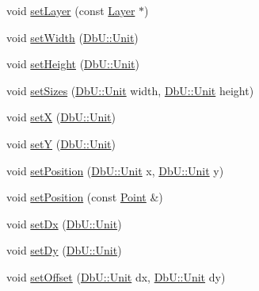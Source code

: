 \begin{DoxyCompactItemize}
\item 
void \mbox{\hyperlink{classHurricane_1_1Contact_aec627634d5b6cfc5079a02b1b518b50e}{set\+Layer}} (const \mbox{\hyperlink{classHurricane_1_1Layer}{Layer}} $\ast$)
\item 
void \mbox{\hyperlink{classHurricane_1_1Contact_a08d14ce6cdf3696e472f4a621b936afe}{set\+Width}} (\mbox{\hyperlink{group__DbUGroup_ga4fbfa3e8c89347af76c9628ea06c4146}{Db\+U\+::\+Unit}})
\item 
void \mbox{\hyperlink{classHurricane_1_1Contact_a6480b6a75cc098d3227f27080a2cb42b}{set\+Height}} (\mbox{\hyperlink{group__DbUGroup_ga4fbfa3e8c89347af76c9628ea06c4146}{Db\+U\+::\+Unit}})
\item 
void \mbox{\hyperlink{classHurricane_1_1Contact_a1bded13596d448c6bb9c93271fffe5fd}{set\+Sizes}} (\mbox{\hyperlink{group__DbUGroup_ga4fbfa3e8c89347af76c9628ea06c4146}{Db\+U\+::\+Unit}} width, \mbox{\hyperlink{group__DbUGroup_ga4fbfa3e8c89347af76c9628ea06c4146}{Db\+U\+::\+Unit}} height)
\item 
void \mbox{\hyperlink{classHurricane_1_1Contact_a5b2338675993259feabb641fd9a1996e}{setX}} (\mbox{\hyperlink{group__DbUGroup_ga4fbfa3e8c89347af76c9628ea06c4146}{Db\+U\+::\+Unit}})
\item 
void \mbox{\hyperlink{classHurricane_1_1Contact_a232a49a5dd180e9ff8dfb2bd2a67f2cd}{setY}} (\mbox{\hyperlink{group__DbUGroup_ga4fbfa3e8c89347af76c9628ea06c4146}{Db\+U\+::\+Unit}})
\item 
void \mbox{\hyperlink{classHurricane_1_1Contact_ae44d4d7655428705f13dca34c7167690}{set\+Position}} (\mbox{\hyperlink{group__DbUGroup_ga4fbfa3e8c89347af76c9628ea06c4146}{Db\+U\+::\+Unit}} x, \mbox{\hyperlink{group__DbUGroup_ga4fbfa3e8c89347af76c9628ea06c4146}{Db\+U\+::\+Unit}} y)
\item 
void \mbox{\hyperlink{classHurricane_1_1Contact_aedcc63fe54538939c03fe81a16b0bae0}{set\+Position}} (const \mbox{\hyperlink{classHurricane_1_1Point}{Point}} \&)
\item 
void \mbox{\hyperlink{classHurricane_1_1Contact_a82f29c6b48b0c5a51fe3c1678d71876c}{set\+Dx}} (\mbox{\hyperlink{group__DbUGroup_ga4fbfa3e8c89347af76c9628ea06c4146}{Db\+U\+::\+Unit}})
\item 
void \mbox{\hyperlink{classHurricane_1_1Contact_ac5dadc06ae38c1ff287f031864f58850}{set\+Dy}} (\mbox{\hyperlink{group__DbUGroup_ga4fbfa3e8c89347af76c9628ea06c4146}{Db\+U\+::\+Unit}})
\item 
void \mbox{\hyperlink{classHurricane_1_1Contact_a5c8cb75debcbe10aedc092e2089a975c}{set\+Offset}} (\mbox{\hyperlink{group__DbUGroup_ga4fbfa3e8c89347af76c9628ea06c4146}{Db\+U\+::\+Unit}} dx, \mbox{\hyperlink{group__DbUGroup_ga4fbfa3e8c89347af76c9628ea06c4146}{Db\+U\+::\+Unit}} dy)
\end{DoxyCompactItemize}
